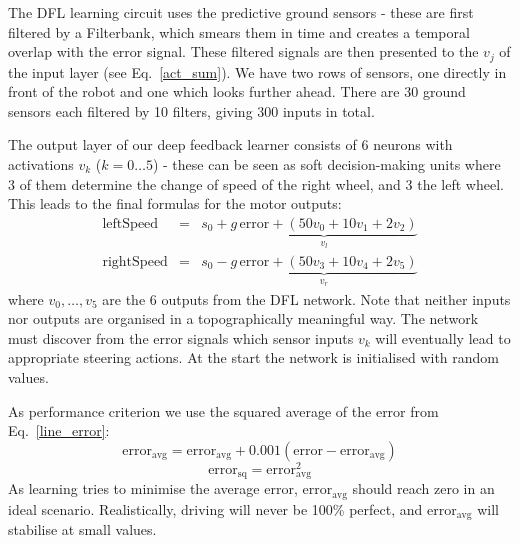 \documentclass{llncs}
\begin{document}
The DFL learning circuit uses the predictive ground sensors - these
are first filtered by a Filterbank, which smears them in time and
creates a temporal overlap with the error signal. These filtered
signals are then presented to the $v_j$ of the input layer (see
Eq.~\ref{act_sum}). We have two rows of sensors, one directly in front
of the robot and one which looks further ahead. There are 30 ground
sensors each filtered by 10 filters, giving 300 inputs in total.

The output layer of our deep feedback learner consists of 6 neurons
with activations $v_k$ ($k=0 \ldots 5$) - these can be seen as soft
decision-making units where 3 of them determine the change of speed of
the right wheel, and 3 the left wheel. This leads to the
final formulas for the motor outputs:
\begin{eqnarray}
  \mathrm{leftSpeed} &=& s_0 + \underbrace{g\, \mathrm{error} + \left( 50 v_0 + 10 v_1 + 2 v_2 \right)}_{v_l} \\
  \mathrm{rightSpeed} &=& s_0 - \underbrace{g\, \mathrm{error} + \left( 50 v_3 + 10 v_4 + 2 v_5 \right)}_{v_r}
\end{eqnarray}
where $v_0, \ldots, v_5$ are the 6 outputs from the DFL network. Note
that neither inputs nor outputs are organised in a topographically
meaningful way. The network must discover from the error signals
which sensor inputs $v_k$ will eventually lead to appropriate steering
actions. At the start the network is initialised with random values.

As performance criterion we use the squared average of the error from
Eq.~\ref{line_error}:
\begin{equation}
  \mathrm{error}_\mathrm{avg} =  \mathrm{error}_\mathrm{avg} + 0.001 (\mathrm{error} - \mathrm{error}_\mathrm{avg}) 
\end{equation}
\begin{equation}
  \mathrm{error}_\mathrm{sq} =  \mathrm{error}_\mathrm{avg}^2 \label{line_sqerr}
\end{equation}
As learning tries to minimise the average error, $\mathrm{error}_\mathrm{avg}$ should reach zero in an ideal
scenario. Realistically, driving will never be 100\% perfect, and $\mathrm{error}_\mathrm{avg}$
will stabilise at small values.
\end{document}
